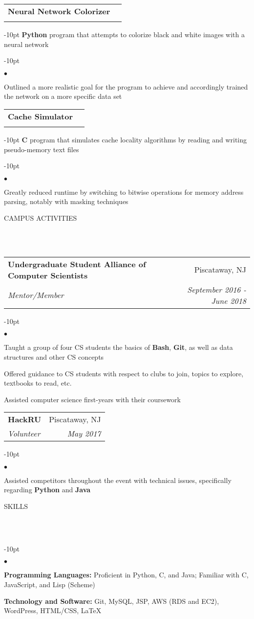 \documentclass[12pt]{article}
\makeatletter
\newcommand{\header}[1]{
	\vspace*{12pt} %
	{\hspace*{-14pt}\vspace*{6pt} #1}
	\vspace*{-6pt} 
	\lineunder
}
\newcommand{\lineunder}{
	\vspace*{-8pt} \\ 
	\hspace*{-18pt} 
	\hrulefill \\
}
\newcommand{\subheading}[4]{
 	\vspace{5pt}
    	\begin{tabular*}{1.01\textwidth}
    		{l@{\extracolsep{\fill}}r}
      		\hspace{-16pt}\textbf{#1} & #2 \\
      		\hspace{-16pt}\textit{\small#3} & \textit{\small #4} \\
    	\end{tabular*}
    \vspace{-4pt}
}
\newenvironment{achievements}{
\begin{adjustwidth}{-10pt}{}
  \begin{list}{$\bullet$}{
  	\topsep 0pt \itemsep -4pt}}
  	{\vspace*{2pt}\end{list}
\end{adjustwidth}
}
\def\cpp{
	{\hspace{-0.25em}C\nolinebreak[4]\hspace{-.05em}\raisebox{.4ex}{\tiny		\bf ++}}}
\makeatother
\begin{document}
\subheading{Neural Network Colorizer}{}{}{}
	\vspace{-15pt}
	\begin{adjustwidth}{-10pt}{}
	\textbf{Python} program that attempts to colorize black and white images with a neural network
	\end{adjustwidth}
	\begin{achievements}
		\item Outlined a more realistic goal for the program to achieve and accordingly trained the network on a more specific data set
	\end{achievements}
	
\subheading{Cache Simulator}{}{}{}
	\vspace{-15pt}
	\begin{adjustwidth}{-10pt}{}
	\textbf{C} program that simulates cache locality algorithms by reading and writing pseudo-memory text files
	\end{adjustwidth}
	\begin{achievements}
		\item Greatly reduced runtime by switching to bitwise operations for memory address parsing, notably with masking techniques 
	\end{achievements}


\header{CAMPUS ACTIVITIES}

\subheading
	{Undergraduate Student Alliance of Computer Scientists}{Piscataway, NJ}
	{Mentor/Member}{September 2016 - June 2018}
	\begin{achievements}
		\item Taught a group of four CS students the basics of \textbf{Bash}, \textbf{Git}, as well as data structures and other CS concepts
		\item Offered guidance to CS students with respect to clubs to join, topics to explore, textbooks to read, etc.
		\item Assisted computer science first-years with their coursework
	\end{achievements}
	
\subheading
	{HackRU}{Piscataway, NJ}
	{Volunteer}{May 2017}
	\begin{achievements}
		\item Assisted competitors throughout the event with technical issues, specifically regarding \textbf{Python} and \textbf{Java}
	\end{achievements}

	
\header{SKILLS}
	\begin{achievements}
		\item{\bf Programming Languages:} Proficient in Python, C, and Java; Familiar with \cpp, JavaScript, and Lisp (Scheme)
		\item{\bf Technology and Software:} Git, MySQL, JSP, AWS (RDS and EC2), WordPress, HTML/CSS, \LaTeX
	\end{achievements}
\end{document}
